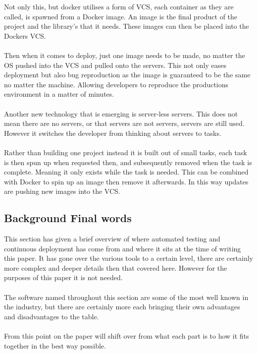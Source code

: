 Not only this, but docker utilises a form of VCS, each container as they are called, is spawned from a Docker image. An image is the final product of the project and the library's that it needs. These images can then be placed into the Dockers VCS.
\\\\
Then when it comes to deploy, just one image needs to be made, no matter the OS pushed into the VCS and pulled onto the servers. This not only eases deployment but also bug reproduction as the image is guaranteed to be the same no matter the machine. Allowing developers to reproduce the productions environment in a matter of minutes. 
\\\\
Another new technology that is emerging is server-less servers. This does not mean there are no servers, or that servers are not servers, servers are still used. However it switches the developer from thinking about servers to tasks.
\\\\
Rather than building one project instead it is built out of small tasks, each task is then spun up when requested then, and subsequently removed when the task is complete. Meaning it only exists while the task is needed. This can be combined with Docker to spin up an image then remove it afterwards. In this way updates are pushing new images into the VCS.

\subsection{Background Final words}

This section has given a brief overview of where automated testing and continuous deployment has come from and where it sits at the time of writing this paper. It has gone over the various tools to a certain level, there are certainly more complex and deeper details then that covered here. However for the purposes of this paper it is not needed.
\\\\
The software named throughout this section are some of the most well known in the industry, but there are certainly more each bringing their own advantages and disadvantages to the table.
\\\\
From this point on the paper will shift over from what each part is to how it fits together in the best way possible.
